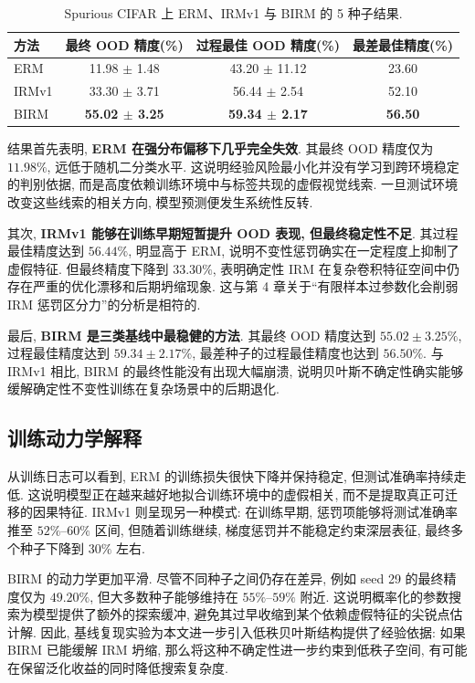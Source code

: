 \documentclass[a4paper,punct=banjiao,twoside]{ctexrep}
\theoremstyle{plain}
\theoremstyle{definition}
\theoremstyle{remark}
\begin{document}
\begin{table}[htbp]
    \centering
    \caption{Spurious CIFAR 上 ERM、IRMv1 与 BIRM 的 5 种子结果.}
    \label{tab:cifar_official_baselines}
    \begin{tabular}{lccc}
        \toprule
        方法 & 最终 OOD 精度(\%) & 过程最佳 OOD 精度(\%) & 最差最佳精度(\%) \\
        \midrule
        ERM & 11.98 $\pm$ 1.48 & 43.20 $\pm$ 11.12 & 23.60 \\
        IRMv1 & 33.30 $\pm$ 3.71 & 56.44 $\pm$ 2.54 & 52.10 \\
        BIRM & \textbf{55.02 $\pm$ 3.25} & \textbf{59.34 $\pm$ 2.17} & \textbf{56.50} \\
        \bottomrule
    \end{tabular}
\end{table}

结果首先表明, \textbf{ERM 在强分布偏移下几乎完全失效}. 其最终 OOD 精度仅为 $11.98\%$, 远低于随机二分类水平. 这说明经验风险最小化并没有学习到跨环境稳定的判别依据, 而是高度依赖训练环境中与标签共现的虚假视觉线索. 一旦测试环境改变这些线索的相关方向, 模型预测便发生系统性反转.

其次, \textbf{IRMv1 能够在训练早期短暂提升 OOD 表现, 但最终稳定性不足}. 其过程最佳精度达到 $56.44\%$, 明显高于 ERM, 说明不变性惩罚确实在一定程度上抑制了虚假特征. 但最终精度下降到 $33.30\%$, 表明确定性 IRM 在复杂卷积特征空间中仍存在严重的优化漂移和后期坍缩现象. 这与第 4 章关于“有限样本过参数化会削弱 IRM 惩罚区分力”的分析是相符的.

最后, \textbf{BIRM 是三类基线中最稳健的方法}. 其最终 OOD 精度达到 $55.02\pm3.25\%$, 过程最佳精度达到 $59.34\pm2.17\%$, 最差种子的过程最佳精度也达到 $56.50\%$. 与 IRMv1 相比, BIRM 的最终性能没有出现大幅崩溃, 说明贝叶斯不确定性确实能够缓解确定性不变性训练在复杂场景中的后期退化.

\subsection{训练动力学解释}

从训练日志可以看到, ERM 的训练损失很快下降并保持稳定, 但测试准确率持续走低. 这说明模型正在越来越好地拟合训练环境中的虚假相关, 而不是提取真正可迁移的因果特征. IRMv1 则呈现另一种模式: 在训练早期, 惩罚项能够将测试准确率推至 $52\%$--$60\%$ 区间, 但随着训练继续, 梯度惩罚并不能稳定约束深层表征, 最终多个种子下降到 $30\%$ 左右.

BIRM 的动力学更加平滑. 尽管不同种子之间仍存在差异, 例如 seed 29 的最终精度仅为 $49.20\%$, 但大多数种子能够维持在 $55\%$--$59\%$ 附近. 这说明概率化的参数搜索为模型提供了额外的探索缓冲, 避免其过早收缩到某个依赖虚假特征的尖锐点估计解. 因此, 基线复现实验为本文进一步引入低秩贝叶斯结构提供了经验依据: 如果 BIRM 已能缓解 IRM 坍缩, 那么将这种不确定性进一步约束到低秩子空间, 有可能在保留泛化收益的同时降低搜索复杂度.
\end{document}
